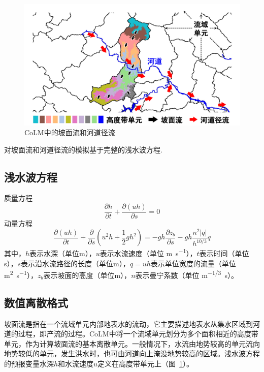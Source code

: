 {
\begin{figure}[htbp]
\centering
\includegraphics[width=\textwidth]{Figures/侧向流/坡面流和河道径流.pdf}
\caption{CoLM中的坡面流和河道径流}
\label{fig:坡面流和河道径流}
\end{figure}
}

对坡面流和河道径流的模拟基于完整的浅水波方程.
 \subsection{浅水波方程}
 质量方程
  \begin{equation}
 \frac{\partial h}{\partial t} + \frac{\partial \left(uh\right)}{\partial s} = 0
 \end{equation}
 动量方程
 \begin{equation}
 \frac{\partial \left(uh\right)}{\partial t} + \frac{\partial}{\partial s}\left(u^2h+\frac{1}{2}gh^2\right) = -gh\frac{\partial z_b}{\partial s}-gh\frac{n^2\left|q\right|}{h^{10/3}}q
  \end{equation}
  其中，$h$表示水深（单位m），$u$表示水流速度（单位 \unit{m.s^{-1}}），$t$表示时间（单位s），$s$表示沿水流路径的长度（单位m），$q=uh$表示单位宽度的流量（单位 \unit{m^2.s^{-1}}），$z_b$表示坡面的高度（单位m），$n$表示曼宁系数（单位 \unit{m^{-1/3}.s}）。


\subsection{数值离散格式}
坡面流是指在一个流域单元内部地表水的流动，它主要描述地表水从集水区域到河道的过程，即产流的过程。CoLM中将一个流域单元划分为多个面积相近的高度带单元，作为计算坡面流的基本离散单元。一般情况下，水流由地势较高的单元流向地势较低的单元，发生洪水时，也可由河道向上淹没地势较高的区域。浅水波方程的预报变量水深$h$和水流速度$u$定义在高度带单元上（图~\ref{fig:坡面流和河道径流}）。

